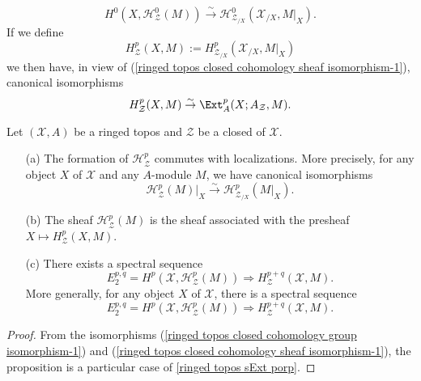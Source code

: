 \begin{equation}\label{ringed topos closed cohomology localization-1}
H^0(X,\mathcal{H}_\mathcal{Z}^0(M)) \stackrel{\sim}{\to } \mathcal{H}^0_{\mathcal{Z}_{/X}}(\mathcal{X}_{/X},M|_X).
\end{equation}
If we define
\begin{equation}\label{ringed topos closed cohomology group on X-1}
H^p_\mathcal{Z}(X,M):=H^p_{\mathcal{Z}_{/X}}(\mathcal{X}_{/X},M|_X)
\end{equation}
we then have, in view of (\ref{ringed topos closed cohomology sheaf isomorphism-1}), canonical isomorphisms
\begin{equation}\label{ringed topos closed cohomology group on X-2}
H^p_\mathcal{Z}(X,M) \stackrel{\sim}{\to } \Ext_A^p(X;A_\mathcal{Z},M).
\end{equation}

\begin{proposition}\label{ringed topos closed cohomology prop}
Let $(\mathcal{X},A)$ be a ringed topos and $\mathcal{Z}$ be a closed of $\mathcal{X}$.
\begin{enumerate}
    \item[(a)] The formation of $\mathcal{H}_\mathcal{Z}^p$ commutes with localizations. More precisely, for any object $X$ of $\mathcal{X}$ and any $A$-module $M$, we have canonical isomorphisms
    \begin{equation}\label{ringed topos closed cohomology prop-1}
    \mathcal{H}^p_\mathcal{Z}(M)|_X \stackrel{\sim}{\to } \mathcal{H}^p_{\mathcal{Z}_{/X}}(M|_X).
    \end{equation}
    \item[(b)] The sheaf $\mathcal{H}^p_\mathcal{Z}(M)$ is the sheaf associated with the presheaf $X\mapsto H^p_\mathcal{Z}(X,M)$.
    \item[(c)] There exists a spectral sequence
    \begin{equation}\label{ringed topos closed cohomology prop-2}
        E_2^{p,q}=H^p(\mathcal{X},\mathcal{H}^p_{\mathcal{Z}}(M))\Rightarrow H^{p+q}_\mathcal{Z}(\mathcal{X},M).
    \end{equation}
    More generally, for any object $X$ of $\mathcal{X}$, there is a spectral sequence
    \begin{equation}\label{ringed topos closed cohomology prop-3}
        E_2^{p,q}=H^p(\mathcal{X},\mathcal{H}^p_{\mathcal{Z}}(M))\Rightarrow H^{p+q}_\mathcal{Z}(\mathcal{X},M).
    \end{equation}
\end{enumerate}
\end{proposition}
\begin{proof}
From the isomorphisms (\ref{ringed topos closed cohomology group isomorphism-1}) and (\ref{ringed topos closed cohomology sheaf isomorphism-1}), the proposition is a particular case of \cref{ringed topos sExt porp}.
\end{proof}

